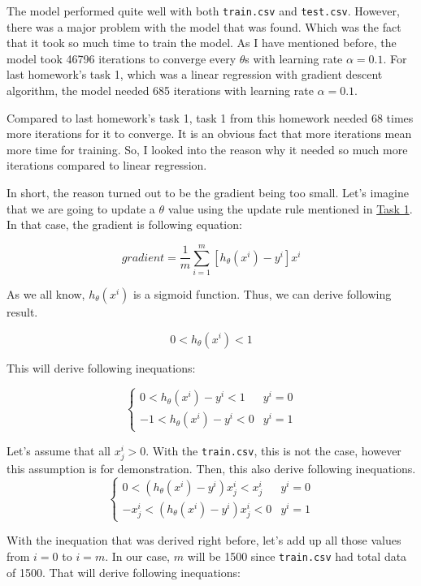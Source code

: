 \documentclass{homework}
\begin{document}
The model performed quite well with both \texttt{train.csv} and \texttt{test.csv}. However, there was a major problem with the model that was found. Which was the fact that it took so much time to train the model. As I have mentioned before, the model took 46796 iterations to converge every $\theta$s with learning rate $\alpha=0.1$. For last homework's task 1, which was a linear regression with gradient descent algorithm, the model needed 685 iterations with learning rate $\alpha=0.1$.

Compared to last homework's task 1, task 1 from this homework needed 68 times more iterations for it to converge. It is an obvious fact that more iterations mean more time for training. So, I looked into the reason why it needed so much more iterations compared to  linear regression.

In short, the reason turned out to be the gradient being too small. Let's imagine that we are going to update a $\theta$ value using the update rule mentioned in \hyperref[sec:task1]{Task 1}. In that case, the gradient is following equation:

\[
    gradient = \frac{1}{m}\sum_{i=1}^{m}[h_\theta(x^i) - y^i]x^i
\]

As we all know, $h_\theta(x^i)$ is a sigmoid function. Thus, we can derive following result.

\[
    0 < h_\theta(x^i) < 1
\]

This will derive following inequations:

\[
    \begin{cases}
    0 < h_\theta(x^i) -y^i < 1 &\text{$y^i = 0$} \\
    -1 < h_\theta(x^i) -y^i < 0 &\text{$y^i = 1$}
    \end{cases}
\]

Let's assume that all $x_j^i > 0$. With the \texttt{train.csv}, this is not the case, however this assumption is for demonstration. Then, this also derive following inequations.
\[
    \begin{cases}
    0 < (h_\theta(x^i) -y^i)x_j^i < x_j^i &\text{$y^i = 0$} \\
    -x_j^i < (h_\theta(x^i) -y^i)x_j^i < 0 &\text{$y^i = 1$}
    \end{cases}
\]

With the inequation that was derived right before, let's add up all those values from $i=0$ to $i=m$. In our case, $m$ will be 1500 since \texttt{train.csv} had total data of 1500. That will derive following inequations:
\end{document}
